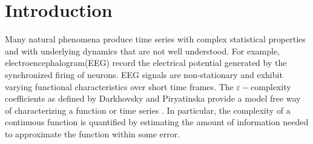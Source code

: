 
% 

% 

\chapter{Introduction}

Many natural phenomena produce time series with complex statistical properties and with
underlying dynamics that are not well understood. 
For example, electroencephalogram(EEG) record
the electrical potential generated by the synchronized
firing of neurons. EEG signals are non-stationary and exhibit varying functional characteristics over short time frames. The $\varepsilon-$complexity coefficients as defined by Darkhovsky and Piryatinska provide a model 
free way of characterizing a function or time series 
\cite{darkhovsky2013}.
In particular, the complexity of a continuous function
is quantified by estimating the amount of information needed to approximate the function within some error. 

